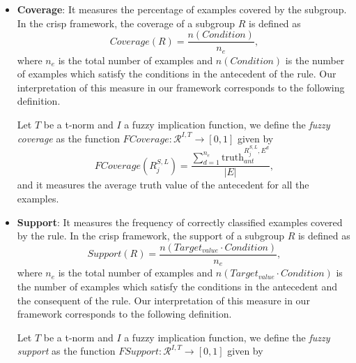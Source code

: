 \begin{itemize}
	\item \textbf{Coverage}:  It measures the percentage of examples covered by the subgroup. In the crisp framework, the coverage of a subgroup $R$ is defined as
	$$Coverage(R)=\frac{n(Condition)}{n_e},$$
	where $n_e$ is the total number of examples and $n(Condition)$ is the number of examples which satisfy the conditions in the antecedent of the rule. Our interpretation of this measure in our framework corresponds to the following definition.
	\begin{definition} Let $T$ be a t-norm and $I$ a fuzzy implication function, we define the \emph{fuzzy coverage} as the function $FCoverage : \mathcal{R}^{I,T} \to [0,1]$ given by  
		$$FCoverage(R^{S,L}_j) = \frac{\displaystyle \sum_{d=1}^{n_e} \text{truth}_{ant}^{R^{S,L}_j,E^d}}{|E|},$$
		and it measures the average truth value of the antecedent for all the examples.
	\end{definition}
	\item \textbf{Support}: It measures the frequency of correctly classified examples covered by the rule. In the crisp framework, the support of a subgroup $R$ is defined as
	$$Support(R)=\frac{n(Target_{value} \cdot Condition)}{n_e},$$
	where $n_e$ is the total number of examples and $n(Target_{value} \cdot Condition)$ is the number of examples which satisfy the conditions in the antecedent and the consequent of the rule. Our interpretation of this measure in our framework corresponds to the following definition.
	\begin{definition}
		Let $T$ be a t-norm and $I$ a fuzzy implication function, we define the \textit{fuzzy support} as the function $FSupport : \mathcal{R}^{I,T} \to [0,1]$ given by 

\end{definition}
\end{itemize}
